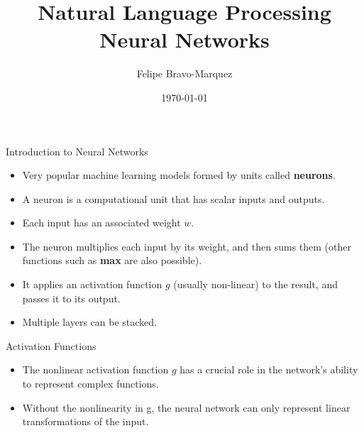 \documentclass[handout]{beamer}
\title{Natural Language Processing \\ Neural Networks}
\author[Felipe Bravo Márquez]{\footnotesize
 \textcolor[rgb]{0.00,0.00,1.00}{Felipe Bravo-Marquez}}
\date{\today}
\begin{document}
\begin{frame}
\titlepage


\end{frame}





\begin{frame}{Introduction to Neural Networks}
\begin{scriptsize}
\begin{itemize}
\item Very popular machine learning models formed by units called \textbf{neurons}.
\item A neuron is a computational unit that has scalar inputs and outputs. 
\item  Each input has an associated weight $w$.
 \item The neuron multiplies each input by its weight, and then sums them (other functions such as \textbf{max} are also possible). 
\item It applies an activation function $g$ (usually non-linear) to the result, and passes it to its output.
\item Multiple layers can be stacked.
\end{itemize}


\end{scriptsize}
\end{frame}


\begin{frame}{Activation Functions}

\begin{scriptsize}
\begin{itemize}
\item The nonlinear activation function $g$ has a crucial role in the network's ability to represent complex functions. 
\item Without the nonlinearity in g, the neural network can only represent linear transformations of the input.
\end{itemize}


\end{scriptsize}


\end{frame}
\end{document}
